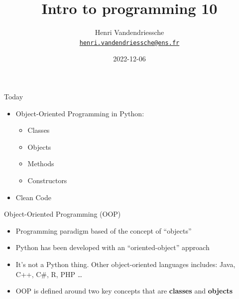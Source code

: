 \documentclass[
  8pt,
  ignorenonframetext,
]{beamer}
\title{Intro to programming 10}
\author{Henri Vandendriessche\\
\href{mailto:henri.vandendriessche@ens.fr}{\nolinkurl{henri.vandendriessche@ens.fr}}}
\date{2022-12-06}
\providecommand{\tightlist}{%
  \setlength{\itemsep}{0pt}\setlength{\parskip}{0pt}}
\begin{document}
\frame{\titlepage}

\begin{frame}{Today}
\protect\hypertarget{today}{}
\begin{itemize}
\tightlist
\item
  Object-Oriented Programming in Python:

  \begin{itemize}
  \tightlist
  \item
    Classes
  \item
    Objects
  \item
    Methods
  \item
    Constructors
  \end{itemize}
\item
  Clean Code
\end{itemize}
\end{frame}

\begin{frame}{Object-Oriented Programming (OOP)}
\protect\hypertarget{object-oriented-programming-oop}{}
\begin{itemize}[<+->]
\tightlist
\item
  Programming paradigm based of the concept of ``objects''
\end{itemize}

\begin{itemize}[<+->]
\tightlist
\item
  Python has been developed with an ``oriented-object'' approach
\end{itemize}

\begin{itemize}[<+->]
\tightlist
\item
  It's not a Python thing. Other object-oriented languages includes:
  Java, C++, C\#, R, PHP \ldots{}
\end{itemize}

\begin{itemize}[<+->]
\tightlist
\item
  OOP is defined around two key concepts that are \textbf{classes} and
  \textbf{objects}
\end{itemize}
\end{frame}
\end{document}
